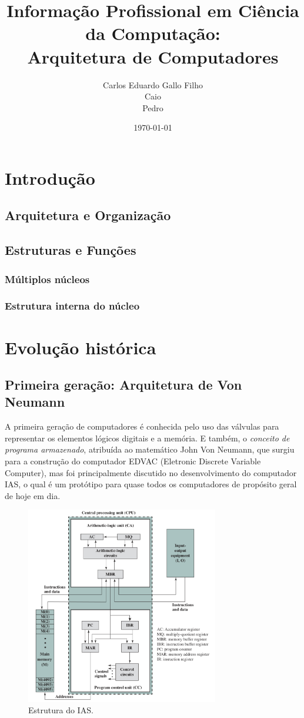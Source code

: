 \documentclass{article}
\title{Informação Profissional em Ciência da Computação:\\
	Arquitetura de Computadores}
\author{Carlos Eduardo Gallo Filho \\
	Caio \\
	Pedro}
\date{\today}
\begin{document}
\maketitle

\section{Introdução}
\subsection{Arquitetura e Organização}
\subsection{Estruturas e Funções}
\subsubsection{Múltiplos núcleos}
\subsubsection{Estrutura interna do núcleo}

\section{Evolução histórica}
\subsection{Primeira geração: Arquitetura de Von Neumann}
A primeira geração de computadores é conhecida pelo uso das válvulas para
representar os elementos lógicos digitais e a memória. E também, o
\textit{conceito de programa armazenado}, atribuída ao matemático John Von
Neumann, que surgiu para a construção do computador EDVAC (Eletronic Discrete
Variable Computer), mas foi principalmente discutido no desenvolvimento do
computador IAS, o qual é um protótipo para quase todos os computadores de
propósito geral de hoje em dia.

\begin{figure}[h]
    \caption{Estrutura do IAS.}
    \centering
    \includegraphics[width=0.75\textwidth]{ias.png}
\end{figure}
\end{document}
